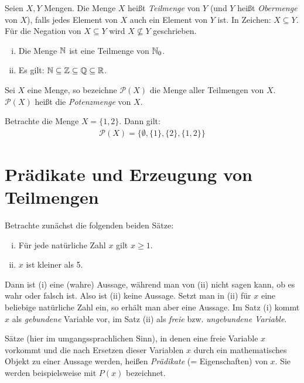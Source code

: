 \begin{mydef}
Seien $X,Y$ Mengen.
Die Menge $X$ heißt \textit{Teilmenge} von $Y$ (und $Y$ heißt
\textit{Obermenge} von $X$), falls jedes Element von $X$ auch ein Element
von $Y$ ist.
In Zeichen: $X \subseteq Y$.
Für die Negation von $X \subseteq Y$ wird $X \nsubseteq Y$ geschrieben.
\end{mydef}


\begin{example}
\begin{enumerate}[(i)]
\item Die Menge $\mathbb{N}$ ist eine Teilmenge von $\mathbb{N}_0$.
\item Es gilt: $\mathbb{N} \subseteq \mathbb{Z} \subseteq \mathbb{Q} \subseteq \mathbb{R}$.
\end{enumerate}
\end{example}


\begin{mydef}
Sei $X$ eine Menge, so bezeichne $\mathcal{P}(X)$ die Menge aller Teilmengen
von $X$.
$\mathcal{P}(X)$ heißt die \textit{Potenzmenge} von $X$.
\end{mydef}


\begin{example}
Betrachte die Menge $X = \{1,2\}$.
Dann gilt:
\begin{align*}
\mathcal{P}(X) = \{\emptyset, \{1\}, \{2\}, \{1,2\}\}
\end{align*}
\end{example}


\section{Prädikate und Erzeugung von Teilmengen}

Betrachte zunächst die folgenden beiden Sätze:

\begin{enumerate}[(i)]
\item  Für jede natürliche Zahl $x$ gilt $x \geq 1$.
\item $x$ ist kleiner als 5.
\end{enumerate}

Dann ist (i) eine (wahre) Aussage, während man von (ii) nicht sagen kann,
ob es wahr oder falsch ist.
Also ist (ii) keine Aussage.
Setzt man in (ii) für $x$ eine beliebige natürliche Zahl ein, so erhält man
aber eine Aussage.
Im Satz (i) kommt $x$ als \textit{gebundene} Variable vor, im Satz (ii) als
\textit{freie} bzw. \textit{ungebundene Variable}.


\begin{mydef}
Sätze (hier im umgangssprachlichen Sinn), in denen eine freie Variable $x$
vorkommt und die nach Ersetzen dieser Variablen $x$ durch ein mathematisches
Objekt zu einer Aussage werden, heißen \textit{Prädikate} (= Eigenschaften)
von $x$.
Sie werden beispielsweise mit $P(x)$ bezeichnet.
\end{mydef}


